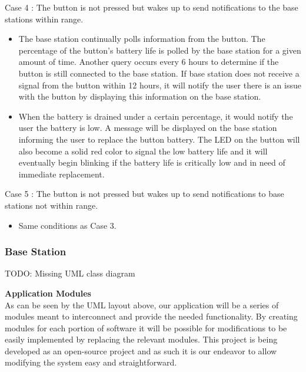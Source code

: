 \documentclass[journal,compsoc]{IEEEtran}
\begin{document}
\begin{LaTeXdescription}
\begin{itemize}
  \end{itemize}
\item[Case 4]:  The button is not pressed but wakes up to send notifications to the base stations within range.
  \begin{itemize}
    \item The base station continually polls information from the button.  The percentage of the button’s battery life is polled by the base station for a given amount of time.  Another query occurs every 6 hours to determine if the button is still connected to the base station.  If base station does not receive a signal from the button within 12 hours, it will notify the user there is an issue with the button by displaying this information on the base station.
    \item When the battery is drained under a certain percentage, it would notify the user the battery is low.  A message will be displayed on the base station informing the user to replace the button battery.  The LED on the button will also become a solid red color to signal the low battery life and it will eventually begin blinking if the battery life is critically low and in need of immediate replacement.
  \end{itemize}
\item[Case 5]: The button is not pressed but wakes up to send notifications to base stations not within range.
  \begin{itemize}
    \item Same conditions as Case 3.
  \end{itemize}
\end{LaTeXdescription}

\subsubsection{Base Station}

TODO: Missing UML class diagram

\noindent \textbf {Application Modules}\\
As can be seen by the UML layout above, our application will be a series of modules meant to interconnect and provide the needed functionality. By creating modules for each portion of software it will be possible for modifications to be easily implemented by replacing the relevant modules. This project is being developed as an open-source project and as such it is our endeavor to allow modifying the system easy and straightforward.\\
\end{document}
